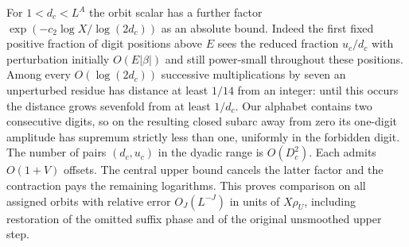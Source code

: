 \documentclass[11pt,a4paper]{article}
\theoremstyle{paperplain}
\numberwithin{equation}{section}
\begin{document}
For \(1<d_c<L^A\) the orbit scalar has a further factor
\(\exp(-c_2\log X/\log(2d_c))\) as an absolute bound. Indeed the
first fixed positive fraction of digit positions above \(E\) sees
the reduced fraction \(u_c/d_c\) with perturbation initially
\(O(E|\beta|)\) and still power-small throughout these positions.
Among every \(O(\log(2d_c))\) successive multiplications by seven
an unperturbed residue has distance at least \(1/14\) from an integer:
until this occurs the distance grows sevenfold from at least \(1/d_c\).
Our alphabet contains two consecutive digits, so on the resulting
closed subarc away from zero its one-digit amplitude has supremum
strictly less than one, uniformly in the forbidden digit.
The number of pairs \((d_c,u_c)\) in the dyadic range is \(O(D_c^2)\).
Each admits \(O(1+V)\) offsets. The central upper bound cancels the
latter factor and the contraction pays the remaining logarithms.
This proves comparison on all assigned orbits with relative error
\(O_J(L^{-J})\) in units of \(X\rho_U\), including restoration of
the omitted suffix phase and of the original unsmoothed upper step.
\end{document}

